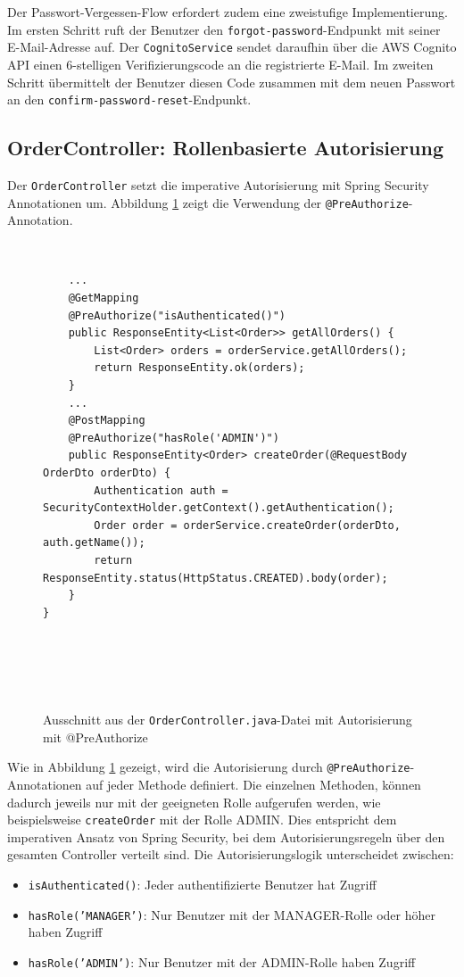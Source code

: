 Der Passwort-Vergessen-Flow erfordert zudem eine zweistufige Implementierung. Im ersten Schritt ruft der Benutzer den \texttt{forgot-password}-Endpunkt mit seiner E-Mail-Adresse auf. Der \texttt{CognitoService} sendet daraufhin über die \ac{AWS} Cognito \ac{API} einen 6-stelligen Verifizierungscode an die registrierte E-Mail. Im zweiten Schritt übermittelt der Benutzer diesen Code zusammen mit dem neuen Passwort an den \texttt{confirm-password-reset}-Endpunkt.

\subsection{OrderController: Rollenbasierte Autorisierung}

Der \texttt{OrderController} setzt die imperative Autorisierung mit Spring Security Annotationen um. Abbildung \ref{fig:order_controller} zeigt die Verwendung der \texttt{@PreAuthorize}-Annotation.

\begin{figure}[h]
    \begin{verbatim}
    ...
    @GetMapping
    @PreAuthorize("isAuthenticated()")
    public ResponseEntity<List<Order>> getAllOrders() {
        List<Order> orders = orderService.getAllOrders();
        return ResponseEntity.ok(orders);
    }
    ...
    @PostMapping
    @PreAuthorize("hasRole('ADMIN')")
    public ResponseEntity<Order> createOrder(@RequestBody OrderDto orderDto) {
        Authentication auth = SecurityContextHolder.getContext().getAuthentication();
        Order order = orderService.createOrder(orderDto, auth.getName());
        return ResponseEntity.status(HttpStatus.CREATED).body(order);
    }
}
    \end{verbatim}
    \caption{Ausschnitt aus der \texttt{OrderController.java}-Datei mit Autorisierung mit @PreAuthorize}
    \label{fig:order_controller}
\end{figure}

Wie in Abbildung \ref{fig:order_controller} gezeigt, wird die Autorisierung durch \texttt{@PreAuthorize}-Annotationen auf jeder Methode definiert. Die einzelnen Methoden, können dadurch jeweils nur mit der geeigneten Rolle aufgerufen werden, wie beispielsweise \texttt{createOrder} mit der Rolle ADMIN. Dies entspricht dem imperativen Ansatz von Spring Security, bei dem Autorisierungsregeln über den gesamten Controller verteilt sind. Die Autorisierungslogik unterscheidet zwischen:
\begin{itemize}
    \item \texttt{isAuthenticated()}: Jeder authentifizierte Benutzer hat Zugriff
    \item \texttt{hasRole('MANAGER')}: Nur Benutzer mit der MANAGER-Rolle oder höher haben Zugriff
    \item \texttt{hasRole('ADMIN')}: Nur Benutzer mit der ADMIN-Rolle haben Zugriff
\end{itemize}

